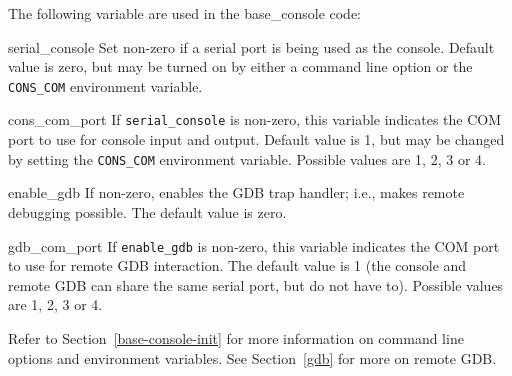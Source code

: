 \label{base-console}
\begin{apisyn}
\end{apisyn}
\begin{apidesc}
The following variable are used in the base_console code:
\begin{csymlist}
	\item[serial_console]	
		Set non-zero if a serial port is being used as the console.
		Default value is zero, but may be turned on by either a
		command line option or the \texttt{CONS_COM} environment
		variable.
	\item[cons_com_port]	
		If \texttt{serial_console} is non-zero, this variable
		indicates the COM port to use for console input and output.
		Default value is 1, but may be changed by setting the
		\texttt{CONS_COM} environment variable.
		Possible values are 1, 2, 3 or 4.
	\item[enable_gdb]	
		If non-zero, enables the GDB trap handler;
		i.e., makes remote debugging possible.
		The default value is zero.
	\item[gdb_com_port]	
		If \texttt{enable_gdb} is non-zero, this variable
		indicates the COM port to use for remote GDB interaction.
		The default value is 1
		(the console and remote GDB can share the same serial port,
		but do not have to).
		Possible values are 1, 2, 3 or 4.
\end{csymlist}
Refer to Section~\ref{base-console-init} for more information on command
line options and environment variables.
See Section~\ref{gdb} for more on remote GDB\@.
\end{apidesc}

